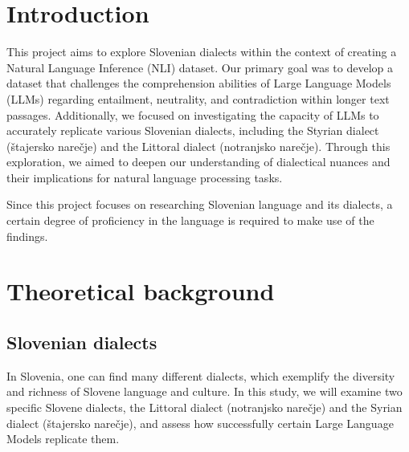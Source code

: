 \documentclass[fleqn,moreauthors,10pt]{ds_report}
\affiliation{\textit{Advisors: Aleš Žagar}}
\begin{document}
\flushbottom 

\maketitle 

\thispagestyle{empty} 


\section*{Introduction}

    This project aims to explore Slovenian dialects within the context of creating a Natural Language Inference (NLI) dataset. Our primary goal was to develop a dataset that challenges the comprehension abilities of Large Language Models (LLMs) regarding entailment, neutrality, and contradiction within longer text passages. Additionally, we focused on investigating the capacity of LLMs to accurately replicate various Slovenian dialects, including the Styrian dialect (štajersko narečje) and the Littoral dialect (notranjsko narečje). Through this exploration, we aimed to deepen our understanding of dialectical nuances and their implications for natural language processing tasks.

    Since this project focuses on researching Slovenian language and its dialects, a certain degree of proficiency in the language is required to make use of the findings.


\section{Theoretical background}

\subsection{Slovenian dialects}

    In Slovenia, one can find many different dialects, which exemplify the diversity and richness of  Slovene language and culture. In this study, we will examine two specific Slovene dialects, the Littoral dialect (notranjsko narečje) and the Syrian dialect (štajersko narečje), and assess how successfully certain Large Language Models replicate them.
    
\end{document}
